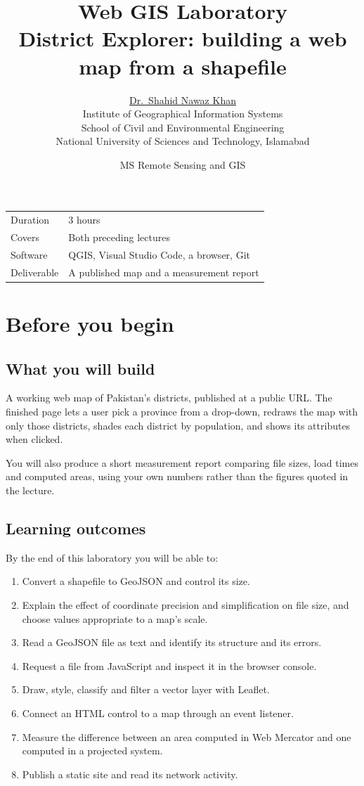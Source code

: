 \documentclass{article}
\title{Web GIS Laboratory\\[.3em]\large District Explorer:
       building a web map from a shapefile}
\author{\href{https://shahidnawazkhan.github.io}{Dr.\ Shahid Nawaz Khan}\\
        Institute of Geographical Information Systems\\
        School of Civil and Environmental Engineering\\
        National University of Sciences and Technology, Islamabad}
\date{MS Remote Sensing and GIS}
\begin{document}
\maketitle

\begin{tabularx}{\textwidth}{@{}L{3.4cm} X@{}}
\toprule
Duration    & 3 hours \\
Covers      & Both preceding lectures \\
Software    & QGIS, Visual Studio Code, a browser, Git \\
Deliverable & A published map and a measurement report \\
\bottomrule
\end{tabularx}

\tableofcontents


\section{Before you begin}

\subsection{What you will build}

A working web map of Pakistan's districts, published at a public URL.
The finished page lets a user pick a province from a drop-down, redraws
the map with only those districts, shades each district by population,
and shows its attributes when clicked.

You will also produce a short measurement report comparing file sizes,
load times and computed areas, using your own numbers rather than the
figures quoted in the lecture.

\subsection{Learning outcomes}

By the end of this laboratory you will be able to:

\begin{enumerate}
  \item Convert a shapefile to GeoJSON and control its size.
  \item Explain the effect of coordinate precision and simplification on
        file size, and choose values appropriate to a map's scale.
  \item Read a GeoJSON file as text and identify its structure and its
        errors.
  \item Request a file from JavaScript and inspect it in the browser
        console.
  \item Draw, style, classify and filter a vector layer with Leaflet.
  \item Connect an HTML control to a map through an event listener.
  \item Measure the difference between an area computed in Web Mercator
        and one computed in a projected system.
  \item Publish a static site and read its network activity.
\end{enumerate}
\end{document}
